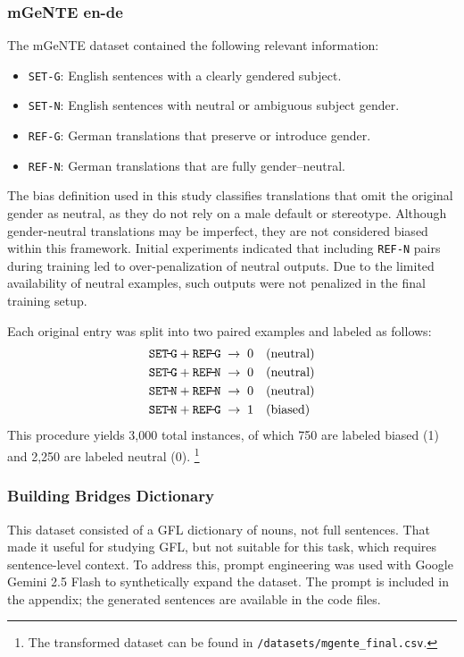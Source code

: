 \subsubsection{mGeNTE en-de} The mGeNTE dataset contained the following relevant information:  

\begin{itemize}  
  \item \texttt{SET-G}: English sentences with a clearly gendered subject.  
  \item \texttt{SET-N}: English sentences with neutral or ambiguous subject gender.  
  \item \texttt{REF-G}: German translations that preserve or introduce gender.  
  \item \texttt{REF-N}: German translations that are fully gender–neutral.  
\end{itemize}  

\noindent
The bias definition used in this study classifies translations that omit the original gender as neutral, as they do not rely on a male default or stereotype. Although gender-neutral translations may be imperfect, they are not considered biased within this framework. Initial experiments indicated that including \texttt{REF-N} pairs during training led to over-penalization of neutral outputs. Due to the limited availability of neutral examples, such outputs were not penalized in the final training setup.

Each original entry was split into two paired examples and labeled as follows:  
\[
\begin{aligned}
\texttt{SET\!-\!G} + \texttt{REF\!-\!G} &\;\rightarrow\; 0 \quad(\text{neutral})\\
\texttt{SET\!-\!G} + \texttt{REF\!-\!N} &\;\rightarrow\; 0 \quad(\text{neutral})\\
\texttt{SET\!-\!N} + \texttt{REF\!-\!N} &\;\rightarrow\; 0 \quad(\text{neutral})\\
\texttt{SET\!-\!N} + \texttt{REF\!-\!G} &\;\rightarrow\; 1 \quad(\text{biased})
\end{aligned}
\]  
This procedure yields 3,000 total instances, of which 750 are labeled biased (1) and 2,250 are labeled neutral (0). \footnote{The transformed dataset can be found in \texttt{/datasets/mgente\_final.csv}.} 

\subsubsection{Building Bridges Dictionary} 
This dataset consisted of a GFL dictionary of nouns, not full sentences. That made it useful for studying GFL, but not suitable for this task, which requires sentence-level context. To address this, prompt engineering was used with Google Gemini 2.5 Flash to synthetically expand the dataset. The prompt is included in the appendix; the generated sentences are available in the code files.

